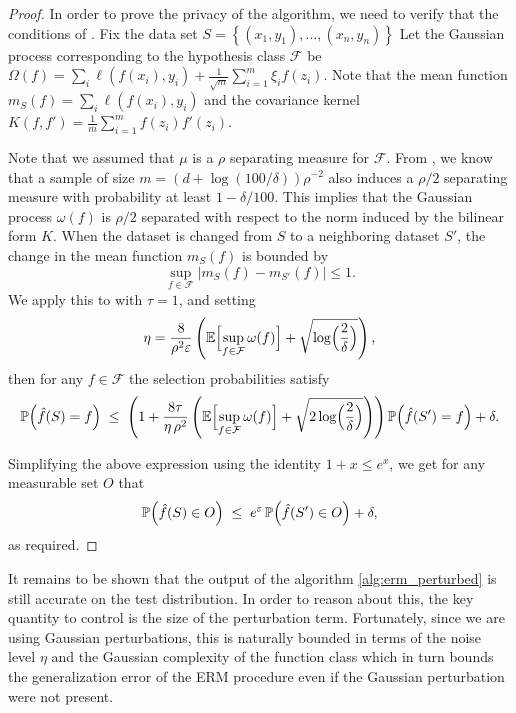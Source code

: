     \begin{proof}
        In order to prove the privacy of the algorithm, we need to verify that the conditions of .
    Fix the data set $S = \left\{ (x_1 , y_1) , \dots , (x_n , y_n) \right\} $ 
    Let the Gaussian process corresponding to the hypothesis class $\mathcal{F} $  be $\Omega(f) =  \sum_i \ell(f(x_i) , y_i ) +    \frac{1}{ \sqrt{m}} \sum_{i=1}^{m} \xi_i f(z_i)$.
    Note that the mean function $m_S(f) =  \sum_i \ell(f(x_i) , y_i )$ and the covariance kernel $K(f,f') = \frac{1}{m} \sum_{i=1}^{m} f(z_i) f'(z_i)$.

    
    Note that we assumed that $\mu$ is a $\rho$ separating measure for $\mathcal{F}$.
    From , we know that a sample of size $m = (d + \log(100/ \delta)) \rho^{-2}$ also induces a $ \rho / 2 $ separating measure with probability at least $1 - \delta/100$. 
    This implies that the Gaussian process $\omega(f)$ is $\rho/2$ separated with respect to the norm induced by the bilinear form $K$.
    When the dataset is changed from \(S\) to a neighboring dataset \(S'\), the change in the mean function \(m_S(f)\) is bounded by
    \[
    \sup_{f\in\mathcal{F}  } \bigl| m_S(f) - m_{S'}(f) \bigr| \le 1.
    \]
    We apply this to  with $ \tau = 1 $, and setting 
    \[
    \eta =  \frac{8} {\rho^2 \epsilon } \left( \mathbb{E}\Bigl[\sup_{f\in\mathcal{F}} \omega(f)\Bigr] + \sqrt{\log\Bigl(\frac{2}{\delta}\Bigr)} \right),
    \]
    then for any \(f\in \mathcal{F}\) the selection probabilities satisfy
    \[
    \mathbb{P}\Bigl( \hat{f}(S) = f \Bigr) \;\le\; \left(1 + \frac{8\tau}{\eta\,  \rho^2} \left( \mathbb{E}\Bigl[\sup_{f\in\mathcal{F}} \omega(f)\Bigr] + \sqrt{2\log\Bigl(\frac{2}{\delta}\Bigr)} \right) \right) \mathbb{P}\Bigl( \hat{f}(S') = f \Bigr) + \delta.
    \]

    Simplifying the above expression using the identity $1+ x \leq e^x $, we get for any measurable set \(O\) that 
    \[
    \mathbb{P}\Bigl( \hat{f}(S) \in O \Bigr) \;\le\; e^{\epsilon} \, \mathbb{P}\Bigl( \hat{f}(S') \in O \Bigr) + \delta,
    \]
   as required. 
    \end{proof}


    It remains to be shown that the output of the algorithm \cref{alg:erm_perturbed} is still accurate on the test distribution. 
    In order to reason about this, the key quantity to control is the size of the perturbation term. 
    Fortunately, since we are using Gaussian perturbations, this is naturally bounded in terms of the noise level $\eta$ and the Gaussian complexity of the function class which in turn bounds the generalization error of the ERM procedure even if the Gaussian perturbation were not present.
    
